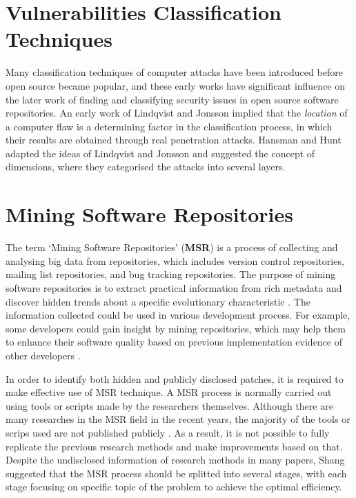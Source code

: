 \documentclass[12pt, a4paper]{report}
\begin{document}
{\section{Vulnerabilities Classification Techniques}
Many classification techniques of computer attacks have been introduced before open source became
popular, and these early works have significant influence on the later work of finding and
classifying security issues in open source software repositories. An early work of Lindqvist and
Jonsson \cite{lindqvist_1999} implied that the \textit{location} of a computer flaw is a determining
factor in the classification process, in which their results are obtained through real penetration
attacks. Hansman and Hunt \cite{hansman_2005} adapted the ideas of Lindqvist and Jonsson and
suggested the concept of dimensions, where they categorised the attacks into several layers.

\section{Mining Software Repositories}
The term `Mining Software Repositories' (\textbf{MSR}) is a process of collecting and analysing big
data from repositories, which includes version control repositories, mailing list repositories, and
bug tracking repositories. The purpose of mining software repositories is to extract practical
information from rich metadata and discover hidden trends about a specific evolutionary
characteristic \cite{kagdi_2007}. The information collected could be used in various development
process. For example, some developers could gain insight by mining repositories, which may help them
to enhance their software quality based on previous implementation evidence of other developers
\cite{hassan_2008}.

In order to identify both hidden and publicly disclosed patches, it is required to make effective
use of MSR technique. A MSR process is normally carried out using tools or scripts made by the
researchers themselves. Although there are many researches in the MSR field in the recent years, the
majority of the tools or scrips used are not published publicly \cite{robles_2010}. As a result, it
is not possible to fully replicate the previous research methods and make improvements based on
that. Despite the undisclosed information of research methods in many papers, Shang
\cite{shang_2009} suggested that the MSR process should be splitted into several stages, with each
stage focusing on specific topic of the problem to achieve the optimal efficiency.

}
\end{document}
